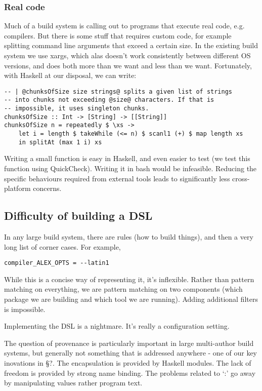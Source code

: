 \subsubsection{Real code}

Much of a build system is calling out to programs that execute real code, e.g. compilers. But there is some stuff that requires custom code, for example splitting command line arguments that exceed a certain size. In the existing build system we use xargs, which alas doesn't work consistently between different OS versions, and does both more than we want and less than we want. Fortunately, with Haskell at our disposal, we can write:

\begin{lstlisting}
-- | @chunksOfSize size strings@ splits a given list of strings
-- into chunks not exceeding @size@ characters. If that is
-- impossible, it uses singleton chunks.
chunksOfSize :: Int -> [String] -> [[String]]
chunksOfSize n = repeatedly $ \xs ->
    let i = length $ takeWhile (<= n) $ scanl1 (+) $ map length xs
    in splitAt (max 1 i) xs
\end{lstlisting}

Writing a small function is easy in Haskell, and even easier to test (we test this function using QuickCheck). Writing it in bash would be infeasible. Reducing the specific behaviours required from external tools leads to significantly less cross-platform concerns.

\subsection{Difficulty of building a DSL}

In any large build system, there are rules (how to build things), and then a very long list of corner cases. For example,

\begin{lstlisting}
compiler_ALEX_OPTS = --latin1
\end{lstlisting}

While this is a concise way of representing it, it's inflexible. Rather than pattern matching on everything, we are pattern matching on two components (which package we are building and which tool we are running). Adding additional filters is impossible.

Implementing the DSL is a nightmare. It's really a configuration setting.


The question of provenance is particularly important in large multi-author build systems, but generally not something that is addressed anywhere - one of our key inovations in \S?. The encapsulation is provided by Haskell modules. The lack of freedom is provided by strong name binding. The problems related to `:' go away by manipulating values rather program text.


